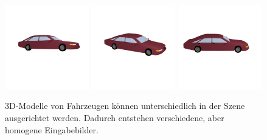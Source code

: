 \begin{figure}[h]
	\centering
  \includegraphics[width=0.325\textwidth]{bilder/limo1_m.png}
  \includegraphics[width=0.325\textwidth]{bilder/limo2_m.png}
  \includegraphics[width=0.325\textwidth]{bilder/limo3_m.png}

	\caption[Verschiedene Perspektiven]{3D-Modelle von Fahrzeugen können unterschiedlich in der Szene ausgerichtet werden. Dadurch entstehen verschiedene, aber homogene Eingabebilder.}
	\label{fig:limo}
\end{figure}


